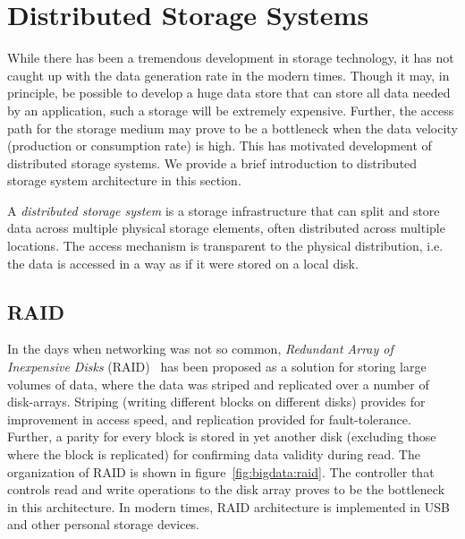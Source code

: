 \section{Distributed Storage Systems}
\label{sec:bigdata:storage}

While there has been a tremendous development in storage technology, it has not caught up with the data generation rate in the modern
times. Though it may, in principle, be possible to develop a huge data store that can store all data needed by an application, such a 
storage will be extremely expensive. Further, the access path for the storage medium may prove to be a bottleneck when the data velocity 
(production or consumption rate) is high. This has motivated development of distributed storage systems. We provide a brief introduction 
to distributed storage system architecture in this section. 

\begin{definition} 
	A {\em distributed storage system} is a storage infrastructure that can split and store data across multiple physical storage 
	elements, often distributed across multiple locations. The access mechanism is transparent to the physical distribution, i.e.
	the data is accessed in a way as if it were stored on a local disk.
\end{definition}

\subsection{RAID}

In the days when networking was not so common, {\em Redundant Array of Inexpensive Disks} (RAID)~\citep{Patterson:1988} has been proposed 
as a solution for storing large volumes of data, where the data was striped and replicated over a number of disk-arrays. Striping (writing
different blocks on different disks) provides for improvement in access speed, and replication provided for fault-tolerance. Further, a
parity for every block is stored in yet another disk (excluding those where the block is replicated) for confirming data validity during
read. The organization of RAID is shown in figure~\ref{fig:bigdata:raid}. The controller that controls read and write operations 
to the disk array proves to be the bottleneck in this architecture. In modern times, RAID architecture is implemented in USB and other 
personal storage devices.

